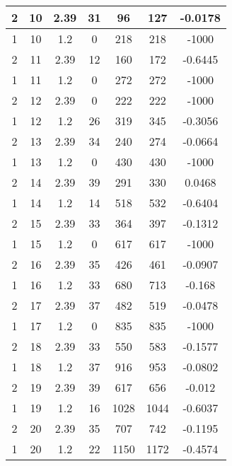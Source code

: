 \documentclass[letterpaper, 12pt]{article}
\begin{document}
\begin{longtable}{|c|c|c|c|c|c|c|}
\hline
2 & 10 & 2.39 & 31 & 96 & 127 & -0.0178 \\
\hline
1 & 10 & 1.2 & 0 & 218 & 218 & -1000 \\
\hline
2 & 11 & 2.39 & 12 & 160 & 172 & -0.6445 \\
\hline
1 & 11 & 1.2 & 0 & 272 & 272 & -1000 \\
\hline
2 & 12 & 2.39 & 0 & 222 & 222 & -1000 \\
\hline
1 & 12 & 1.2 & 26 & 319 & 345 & -0.3056 \\
\hline
2 & 13 & 2.39 & 34 & 240 & 274 & -0.0664 \\
\hline
1 & 13 & 1.2 & 0 & 430 & 430 & -1000 \\
\hline
2 & 14 & 2.39 & 39 & 291 & 330 & 0.0468 \\
\hline
1 & 14 & 1.2 & 14 & 518 & 532 & -0.6404 \\
\hline
2 & 15 & 2.39 & 33 & 364 & 397 & -0.1312 \\
\hline
1 & 15 & 1.2 & 0 & 617 & 617 & -1000 \\
\hline
2 & 16 & 2.39 & 35 & 426 & 461 & -0.0907 \\
\hline
1 & 16 & 1.2 & 33 & 680 & 713 & -0.168 \\
\hline
2 & 17 & 2.39 & 37 & 482 & 519 & -0.0478 \\
\hline
1 & 17 & 1.2 & 0 & 835 & 835 & -1000 \\
\hline
2 & 18 & 2.39 & 33 & 550 & 583 & -0.1577 \\
\hline
1 & 18 & 1.2 & 37 & 916 & 953 & -0.0802 \\
\hline
2 & 19 & 2.39 & 39 & 617 & 656 & -0.012 \\
\hline
1 & 19 & 1.2 & 16 & 1028 & 1044 & -0.6037 \\
\hline
2 & 20 & 2.39 & 35 & 707 & 742 & -0.1195 \\
\hline
1 & 20 & 1.2 & 22 & 1150 & 1172 & -0.4574 \\
\hline
\end{longtable}
\end{document}
